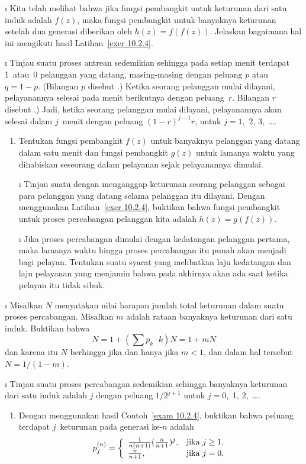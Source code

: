 \begin{LJSItem}
\i\label{exer 10.2.5} Kita telah melihat bahwa jika fungsi pembangkit untuk keturunan dari satu
induk adalah $f(z)$, maka fungsi pembangkit untuk banyaknya
keturunan setelah dua generasi diberikan oleh $h(z) = f(f(z))$.  Jelaskan bagaimana hal ini
mengikuti hasil Latihan~\ref{exer 10.2.4}.

\i\label{exer 10.2.6} Tinjau suatu proses antrean sedemikian sehingga pada setiap menit terdapat 1~atau~0 pelanggan yang datang, masing-masing dengan peluang $p$ atau 
$q = 1 - p$.  (Bilangan $p$ disebut .)  
Ketika seorang pelanggan mulai dilayani, pelayanannya selesai pada menit berikutnya
dengan peluang~$r$.  Bilangan $r$ disebut .)  
Jadi, ketika seorang pelanggan mulai dilayani, pelayanannya akan selesai
dalam $j$~menit dengan peluang $(1 - r)^{j -1}r$, untuk $j = 1$,~2,
3,~\ldots.
\begin{enumerate}
\item Tentukan fungsi pembangkit $f(z)$ untuk banyaknya pelanggan yang
datang dalam satu menit dan fungsi pembangkit $g(z)$ untuk lamanya waktu
yang dihabiskan seseorang dalam pelayanan sejak pelayanannya dimulai.

\i\label{exer 10.2.7} Tinjau suatu  dengan menganggap keturunan seorang pelanggan
sebagai para pelanggan yang datang selama pelanggan itu dilayani.  Dengan menggunakan Latihan~\ref{exer 10.2.4},
buktikan bahwa fungsi pembangkit untuk proses percabangan pelanggan kita adalah $h(z) = g(f(z))$.

\i\label{exer 10.2.8} Jika proses percabangan dimulai dengan kedatangan pelanggan pertama,
maka lamanya waktu hingga proses percabangan itu punah akan menjadi
 bagi pelayan.  Tentukan suatu syarat yang melibatkan laju
kedatangan dan laju pelayanan yang menjamin bahwa pada akhirnya
akan ada saat ketika pelayan itu tidak sibuk.
\end{enumerate}

\i\label{exer 10.2.9} Misalkan $N$ menyatakan nilai harapan jumlah total keturunan dalam suatu proses
percabangan.  Misalkan $m$ adalah rataan banyaknya keturunan dari satu induk.  Buktikan bahwa
$$
N = 1 + \left(\sum p_k \cdot k\right) N = 1 + mN
$$
dan karena itu $N$ berhingga jika dan hanya jika $m < 1$, dan dalam hal tersebut $N = 1/(1
- m)$.

\i\label{exer 10.2.10} Tinjau suatu proses percabangan sedemikian sehingga banyaknya keturunan dari satu
induk adalah $j$ dengan peluang $1/2^{j + 1}$ untuk $j = 0$,~1, 2,~\ldots.
\begin{enumerate}
\item Dengan menggunakan hasil Contoh~\ref{exam 10.2.4}, buktikan bahwa peluang terdapat
$j$~keturunan pada generasi ke-$n$ adalah
$$
p_j^{(n)} = \left \{ \begin{array}{ll}
                \frac{1}{n(n + 1)} (\frac {n}{n + 1})^j, & \mbox{jika $ j \geq 1$}, \\
                                      \frac {n}{n + 1},  & \mbox{jika $ j = 0$}.\end{array}\right.
$$


\end{enumerate}
\end{LJSItem}
